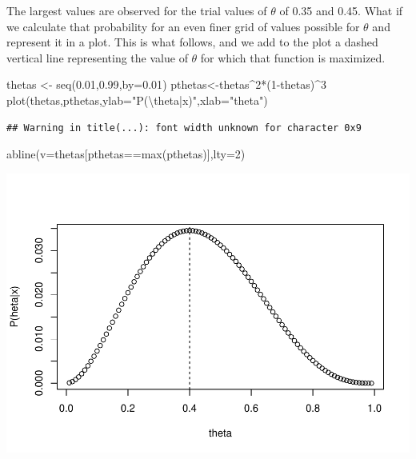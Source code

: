 \documentclass[
]{book}
\newenvironment{Shaded}{\begin{snugshade}}{\end{snugshade}}
\newcommand{\AttributeTok}[1]{\textcolor[rgb]{0.77,0.63,0.00}{#1}}
\newcommand{\DecValTok}[1]{\textcolor[rgb]{0.00,0.00,0.81}{#1}}
\newcommand{\FloatTok}[1]{\textcolor[rgb]{0.00,0.00,0.81}{#1}}
\newcommand{\FunctionTok}[1]{\textcolor[rgb]{0.00,0.00,0.00}{#1}}
\newcommand{\NormalTok}[1]{#1}
\newcommand{\OtherTok}[1]{\textcolor[rgb]{0.56,0.35,0.01}{#1}}
\newcommand{\SpecialCharTok}[1]{\textcolor[rgb]{0.00,0.00,0.00}{#1}}
\newcommand{\StringTok}[1]{\textcolor[rgb]{0.31,0.60,0.02}{#1}}
\begin{document}
The largest values are observed for the trial values of \(\theta\) of 0.35 and 0.45. What if we calculate that probability for an even finer grid of values possible for \(\theta\) and represent it in a plot. This is what follows, and we add to the plot a dashed vertical line representing the value of \(\theta\) for which that function is maximized.

\begin{Shaded}
\begin{Highlighting}[]
\NormalTok{thetas }\OtherTok{\textless{}{-}} \FunctionTok{seq}\NormalTok{(}\FloatTok{0.01}\NormalTok{,}\FloatTok{0.99}\NormalTok{,}\AttributeTok{by=}\FloatTok{0.01}\NormalTok{)}
\NormalTok{pthetas}\OtherTok{\textless{}{-}}\NormalTok{thetas}\SpecialCharTok{\^{}}\DecValTok{2}\SpecialCharTok{*}\NormalTok{(}\DecValTok{1}\SpecialCharTok{{-}}\NormalTok{thetas)}\SpecialCharTok{\^{}}\DecValTok{3}
\FunctionTok{plot}\NormalTok{(thetas,pthetas,}\AttributeTok{ylab=}\StringTok{"P(}\SpecialCharTok{\textbackslash{}t}\StringTok{heta|x)"}\NormalTok{,}\AttributeTok{xlab=}\StringTok{"theta"}\NormalTok{)}
\end{Highlighting}
\end{Shaded}

\begin{verbatim}
## Warning in title(...): font width unknown for character 0x9
\end{verbatim}

\begin{Shaded}
\begin{Highlighting}[]
\FunctionTok{abline}\NormalTok{(}\AttributeTok{v=}\NormalTok{thetas[pthetas}\SpecialCharTok{==}\FunctionTok{max}\NormalTok{(pthetas)],}\AttributeTok{lty=}\DecValTok{2}\NormalTok{)}
\end{Highlighting}
\end{Shaded}

\includegraphics{ECOMODbook_files/figure-latex/ch13.3-1.pdf}
\end{document}
